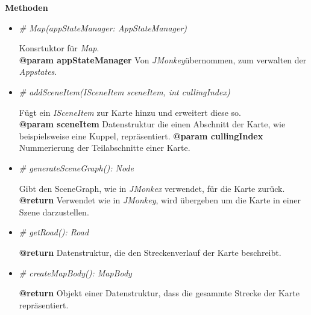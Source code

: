             \pagebreak
            \textbf{Methoden}					
            \begin{itemize}
                \item  \textit{\# Map(appStateManager: AppStateManager)}
                    \begin{leftbar}[0.9\linewidth]
                        Konsrtuktor für \textit{Map}.\\
                        \textbf{@param appStateManager} Von \textit{JMonkey}übernommen, zum verwalten der \textit{Appstates}.
                    \end{leftbar}

                \item  \textit{\# addSceneItem(ISceneItem sceneItem, int cullingIndex)}
                    \begin{leftbar}[0.9\linewidth]
                        Fügt ein \textit{ISceneItem} zur Karte hinzu und erweitert diese so.\\
                        \textbf{@param sceneItem} Datenstruktur die einen Abschnitt der Karte, wie beispielsweise eine Kuppel, 
                        repräsentiert.
                        \textbf{@param cullingIndex} Nummerierung der Teilabschnitte einer Karte.
                    \end{leftbar}    
        
                \item  \textit{\# generateSceneGraph(): Node}
                    \begin{leftbar}[0.9\linewidth]
                        Gibt den SceneGraph, wie in \textit{JMonkex} verwendet, für die Karte zurück.\\
                        \textbf{@return} Verwendet wie in \textit{JMonkey}, wird übergeben um die Karte in einer Szene darzustellen.
                    \end{leftbar}    
            
                \item  \textit{\# getRoad(): Road}
                    \begin{leftbar}[0.9\linewidth]
                        \textbf{@return} Datenstruktur, die den Streckenverlauf der Karte beschreibt.
                    \end{leftbar}    
                
                \item  \textit{\# createMapBody(): MapBody}
                    \begin{leftbar}[0.9\linewidth]
                        \textbf{@return} Objekt einer Datenstruktur, dass die gesammte Strecke der Karte repräsentiert.
                    \end{leftbar}    
            \end{itemize}
    
